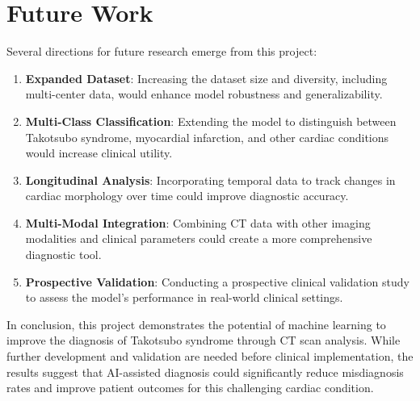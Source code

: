 \documentclass[12pt, BSc]{muthesis}
\begin{document}
\section{Future Work}
Several directions for future research emerge from this project:
\begin{enumerate}
    \item \textbf{Expanded Dataset}: Increasing the dataset size and diversity, including multi-center data, would enhance model robustness and generalizability.
    \item \textbf{Multi-Class Classification}: Extending the model to distinguish between Takotsubo syndrome, myocardial infarction, and other cardiac conditions would increase clinical utility.
    \item \textbf{Longitudinal Analysis}: Incorporating temporal data to track changes in cardiac morphology over time could improve diagnostic accuracy.
    \item \textbf{Multi-Modal Integration}: Combining CT data with other imaging modalities and clinical parameters could create a more comprehensive diagnostic tool.
    \item \textbf{Prospective Validation}: Conducting a prospective clinical validation study to assess the model's performance in real-world clinical settings.
\end{enumerate}

In conclusion, this project demonstrates the potential of machine learning to improve the diagnosis of Takotsubo syndrome through CT scan analysis. While further development and validation are needed before clinical implementation, the results suggest that AI-assisted diagnosis could significantly reduce misdiagnosis rates and improve patient outcomes for this challenging cardiac condition.

 \appendix
    
    
\end{document}
